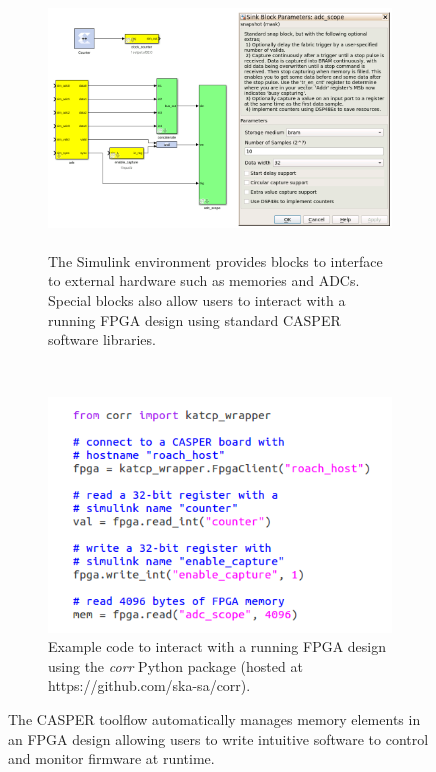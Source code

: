 \documentclass{ws-jai}
\begin{document}
\begin{figure}[t]
\centering
\begin{subfigure}[t]{0.63\textwidth}
  \centering
  \includegraphics[height=2.7in]{./figures/simulink.png}
  \caption{The Simulink environment provides blocks to interface to external hardware such as memories and ADCs. Special blocks also allow users to interact with a running FPGA design using standard CASPER software libraries.}
  \label{fig:simulink}
\end{subfigure}%
~
\begin{subfigure}[t]{0.37\textwidth}
  \centering
  \includegraphics[width=\textwidth]{./figures/some_python_in_an_image.png}
  \caption{Example code to interact with a running FPGA design using the \emph{corr} Python package (hosted at https://github.com/ska-sa/corr).}
  \label{fig:sw}
\end{subfigure}
\caption{The CASPER toolflow automatically manages memory elements in an FPGA design allowing users to write intuitive software to control and monitor firmware at runtime.}
\label{fig:toolflow}
\end{figure}
\end{document}
